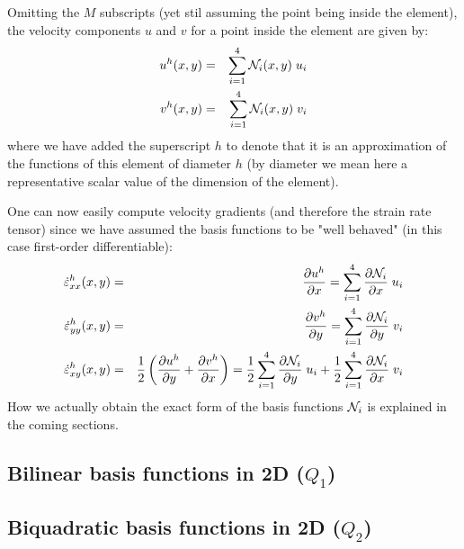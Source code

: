 Omitting the $M$ subscripts (yet stil assuming the point being inside the element), the velocity 
components $u$ and $v$ for a point inside the element
 are given by:
\begin{eqnarray}
u^h(x,y) &=& \sum_{i=1}^4 {\mathcal{N}}_i(x,y)\;  u_i \\
v^h(x,y) &=& \sum_{i=1}^4 {\mathcal{N}}_i(x,y)\;  v_i \label{bf01}
\end{eqnarray}
where we have added the superscript $h$ to denote that it is an approximation of the functions 
of this element of diameter $h$ (by diameter we mean here a representative scalar value of the dimension
of the element). 

One can now easily compute velocity gradients (and therefore the 
strain rate tensor) since we have assumed the basis functions to be "well behaved" 
(in this case first-order differentiable):
\begin{eqnarray}
\dot{\varepsilon}^h_{xx}(x,y) 
&=& \frac{\partial u^h}{\partial x} = \sum_{i=1}^4 \frac{\partial {\mathcal{N}}_i}{\partial x}\;  u_i \\
\dot{\varepsilon}^h_{yy}(x,y) 
&=& \frac{\partial v^h}{\partial y} = \sum_{i=1}^4 \frac{\partial {\mathcal{N}}_i}{\partial y}\;  v_i \\
\dot{\varepsilon}^h_{xy}(x,y) 
&=& \frac{1}{2}\left(\frac{\partial u^h}{\partial y} + \frac{\partial v^h}{\partial x} \right) 
= \frac{1}{2}\sum_{i=1}^4 \frac{\partial {\mathcal{N}}_i}{\partial y}\;  u_i
+ \frac{1}{2}\sum_{i=1}^4 \frac{\partial {\mathcal{N}}_i}{\partial x}\;  v_i
\end{eqnarray}
How we actually obtain the exact form of the basis functions ${\mathcal{N}}_i$ is explained in the coming sections.

\subsection{Bilinear basis functions in 2D ($Q_1$)} \label{ss:q12d}



\subsection{Biquadratic basis functions in 2D ($Q_2$)}\label{ss:q22d}



